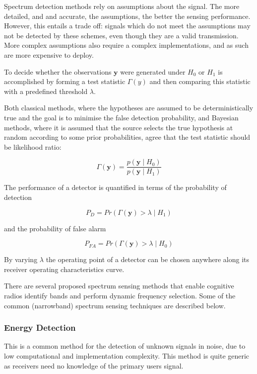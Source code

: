 Spectrum detection methods rely on assumptions about the signal. The more detailed, and and accurate, the assumptions, the better the sensing performance. However, this entails a trade off: signals which do not meet the assumptions may not be detected by these schemes, even though they are a valid transmission. More complex assumptions also require a complex implementations, and as such are more expensive to deploy.

To decide whether the observations \(\textbf{y}\) were generated under \(\textit{H}_{0}\) or \(\textit{H}_{1}\) is accomplished by forming a test statistic \(\Gamma\left(y\right)\) and then comparing this statistic with a predefined threshold \(\lambda\). 

Both classical methods, where the hypotheses are assumed to be deterministically true and the goal is to minimise the false detection probability, and Bayesian methods, where it is assumed that the source selects the true hypothesis at random according to some prior probabilities, agree that the test statistic should be likelihood ratio:

\begin{equation}
\Gamma\left(\textbf{y}\right) = \frac{p\left(\textbf{y}\mid H_0\right)}{p\left(\textbf{y}\mid H_1\right)}
\end{equation}

The performance of a detector is quantified in terms of the probability of detection

\begin{equation}
P_{D} = Pr\left( \Gamma\left(\textbf{y}\right) > \lambda \mid H_1\right)
\end{equation}

and the probability of false alarm 

\begin{equation}
P_{FA} = Pr\left( \Gamma\left(\textbf{y}\right) > \lambda \mid H_0\right)
\end{equation}

By varying \(\lambda\) the operating point of a detector can be chosen anywhere along its receiver operating characteristics curve.

There are several proposed spectrum sensing methods that enable cognitive radios identify bands and perform dynamic frequency selection. Some of the common (narrowband) spectrum sensing techniques are described below.

\subsubsection{Energy Detection}
This is a common method for the detection of unknown signals in noise, due to low computational and implementation complexity. This method is quite generic as receivers need no knowledge of the primary users signal. 

